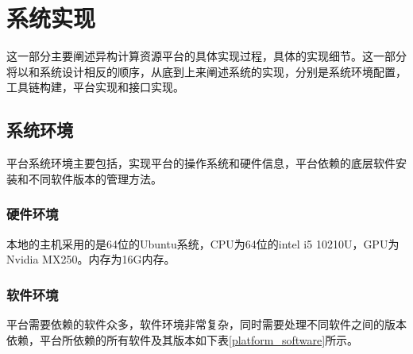 \chapter{系统实现}

这一部分主要阐述异构计算资源平台的具体实现过程，具体的实现细节。这一部分将以和系统设计相反的顺序，从底到上来阐述系统的实现，分别是系统环境配置，工具链构建，平台实现和接口实现。


\section{系统环境}

平台系统环境主要包括，实现平台的操作系统和硬件信息，平台依赖的底层软件安装和不同软件版本的管理方法。

\subsection{硬件环境}

本地的主机采用的是64位的Ubuntu系统，CPU为64位的intel i5 10210U，GPU为Nvidia MX250。内存为16G内存。

\subsection{软件环境}

平台需要依赖的软件众多，软件环境非常复杂，同时需要处理不同软件之间的版本依赖，平台所依赖的所有软件及其版本如下表\ref{platform_software}所示。


